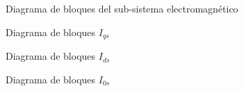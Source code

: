 \documentclass[a4paper, 10pt, onecolumn,journal]{ieeeconf}
\begin{document}
\begin{figure}[thpb]
    \centering
    \begin{adjustbox}{max width=\columnwidth}
    \end{adjustbox}
    \caption{Diagrama de bloques del sub-sistema electromagnético}
    \label{sub-sistema electromagnetico}
\end{figure}

\begin{figure}[thpb]
    \centering
    \begin{adjustbox}{max width=\columnwidth}
    \end{adjustbox}
    \caption{Diagrama de bloques $I_{qs}$}
    \label{diagrama de bloques I_qs}
\end{figure}

\begin{figure}[thpb]
    \centering
    \begin{adjustbox}{max width=\columnwidth}
    \end{adjustbox}
    \caption{Diagrama de bloques $I_{ds}$}
    \label{diagrama de bloques I_ds}
\end{figure}

\begin{figure}[thpb]
    \centering
    \begin{adjustbox}{max width=\columnwidth}
    \end{adjustbox}
    \caption{Diagrama de bloques $I_{0s}$}
    \label{diagrama de bloques I_0s}
\end{figure}
\end{document}
